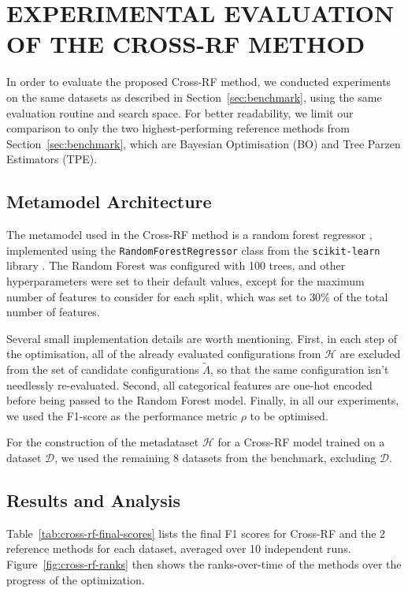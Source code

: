 \section{\uppercase{Experimental evaluation of the Cross-RF method}}
\label{sec:experimental-evaluation}

In order to evaluate the proposed Cross-RF method, we conducted experiments on the same datasets as described in Section~\ref{sec:benchmark}, using the same evaluation routine and search space. For better readability, we limit our comparison to only the two highest-performing reference methods from Section~\ref{sec:benchmark}, which are Bayesian Optimisation (BO) and Tree Parzen Estimators (TPE).

\subsection{Metamodel Architecture}

The metamodel used in the Cross-RF method is a random forest regressor \cite{breiman_random_2001}, implemented using the \texttt{RandomForestRegressor} class from the \texttt{scikit-learn} library \cite{pedregosa_scikit-learn_2011}. The Random Forest was configured with 100 trees, and other hyperparameters were set to their default values, except for the maximum number of features to consider for each split, which was set to \( 30\% \) of the total number of features.

Several small implementation details are worth mentioning. First, in each step of the optimisation, all of the already evaluated configurations from \( \mathcal{H} \) are excluded from the set of candidate configurations \( \tilde{\Lambda} \), so that the same configuration isn't needlessly re-evaluated. Second, all categorical features are one-hot encoded before being passed to the Random Forest model. Finally, in all our experiments, we used the F1-score as the performance metric \( \rho \) to be optimised.

For the construction of the metadataset \( \mathcal{H} \) for a Cross-RF model trained on a dataset \( \mathcal{D} \), we used the remaining 8 datasets from the benchmark, excluding \( \mathcal{D} \).

\subsection{Results and Analysis}
Table~\ref{tab:cross-rf-final-scores} lists the final F1 scores for Cross-RF and the 2 reference methods for each dataset, averaged over 10 independent runs. Figure~\ref{fig:cross-rf-ranks} then shows the ranks-over-time of the methods over the progress of the optimization.

